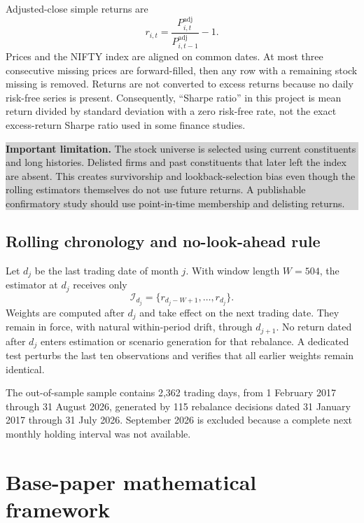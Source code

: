 \documentclass[11pt,a4paper]{article}
\newcommand{\warningBox}[1]{%
  \begin{center}\colorbox{lightgray}{\parbox{0.93\linewidth}{\textbf{Important limitation.} #1}}\end{center}}
\begin{document}
Adjusted-close simple returns are
\begin{equation}
 r_{i,t}=\frac{P^{\text{adj}}_{i,t}}{P^{\text{adj}}_{i,t-1}}-1.
\end{equation}
Prices and the NIFTY index are aligned on common dates. At most three consecutive missing prices are forward-filled, then any row with a remaining stock missing is removed. Returns are not converted to excess returns because no daily risk-free series is present. Consequently, ``Sharpe ratio'' in this project is mean return divided by standard deviation with a zero risk-free rate, not the exact excess-return Sharpe ratio used in some finance studies.

\warningBox{The stock universe is selected using current constituents and long histories. Delisted firms and past constituents that later left the index are absent. This creates survivorship and lookback-selection bias even though the rolling estimators themselves do not use future returns. A publishable confirmatory study should use point-in-time membership and delisting returns.}

\subsection{Rolling chronology and no-look-ahead rule}

Let $d_j$ be the last trading date of month $j$. With window length $W=504$, the estimator at $d_j$ receives only
\begin{equation}
 \mathcal I_{d_j}=\{r_{d_j-W+1},\ldots,r_{d_j}\}.
\end{equation}
Weights are computed after $d_j$ and take effect on the next trading date. They remain in force, with natural within-period drift, through $d_{j+1}$. No return dated after $d_j$ enters estimation or scenario generation for that rebalance. A dedicated test perturbs the last ten observations and verifies that all earlier weights remain identical.

The out-of-sample sample contains 2,362 trading days, from 1 February 2017 through 31 August 2026, generated by 115 rebalance decisions dated 31 January 2017 through 31 July 2026. September 2026 is excluded because a complete next monthly holding interval was not available.

\section{Base-paper mathematical framework}
\label{sec:base-math}
\end{document}
